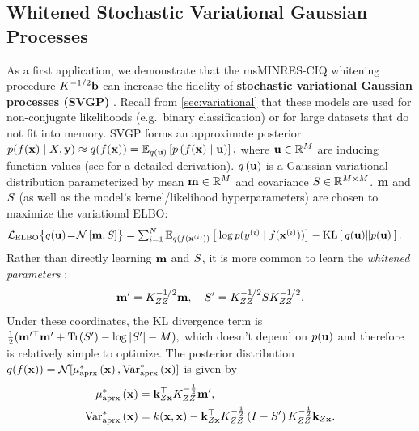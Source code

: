 \subsection{Whitened Stochastic Variational Gaussian Processes}
\label{sec:variational_results}

As a first application, we demonstrate that the msMINRES-CIQ whitening procedure $K^{-1/2} \mathbf{b}$ can increase the fidelity of {\bf stochastic variational Gaussian processes (SVGP)} \cite{hensman2013gaussian,hensman2015scalable,matthews2017scalable}.
Recall from \cref{sec:variational} that these models are used for non-conjugate likelihoods (e.g.~binary classification) or for large datasets that do not fit into memory.
SVGP forms an approximate posterior
$
  p(f(\mathbf{x}) \mid X, \mathbf{y}) \approx q(f(\mathbf{x})) = \operatorname*{\mathbb{E}}_{q(\mathbf{u})} \left[  p\left( f(\mathbf{x}) \mid \mathbf{u} \right) \right],
$
where $\mathbf{u} \in \mathbb{R}^M$ are {inducing function values} (see \citep{hensman2015scalable,matthews2017scalable} for a detailed derivation).
$q \left( \mathbf{u} \right)$ is a Gaussian variational distribution parameterized by mean $\mathbf{m} \in \mathbb{R}^M$ and covariance $S \in \mathbb{R}^{M \times M}$.
$\mathbf{m}$ and $S$ (as well as the model's kernel/likelihood hyperparameters) are chosen to maximize the variational ELBO:
%
\begin{align*}
  \loglik_\text{ELBO}\bigl\{ q(\bu) \! = \! \normaldist{\bmm}{\bS} \bigr\} &= \textstyle\sum_{i=1}^N \Evover{q(f(\bx^{(i)}))}{  \: \log p( y^{(i)} \mid f(\bx^{(i)}) ) } - \kl{ q(\bu) }{ p(\bu) }.
\end{align*}
%
Rather than directly learning $\mathbf{m}$ and $S$, it is more common to learn the \emph{whitened parameters} \cite{kuss2005assessing,matthews2017scalable}:
$$ \mathbf{m}' = K_{ZZ}^{- 1/ 2} \mathbf{m}, \quad S' = K_{ZZ}^{-1 / 2} S K_{ZZ}^{-1 / 2}. $$
Under these coordinates, the KL divergence term is
$\frac{1}{2} ( \bmm^{\prime \top} \bmm' + \tr{ \bS' } - \log \vert \bS' \vert - M ),$
%
which doesn't depend on $p(\mathbf{u})$ and therefore is relatively simple to optimize.
The posterior distribution $q(f(\bx)) = \normaldist{\ameantest{\bx}}{\avartest{\bx}}$ is given by
%
\begin{equation}
  \begin{split}
    \mu^*_\text{aprx} \left( \mathbf{x} \right) &= \mathbf{k}_{Z\mathbf{x}}^\top K_{ZZ}^{-\frac 1 2} \mathbf{m}',
    \\
    \text{Var}^*_\text{aprx} \left( \mathbf{x} \right) &= k(\mathbf{x}, \mathbf{x}) -
      \mathbf{k}_{Z\mathbf{x}}^\top K_{ZZ}^{-\frac 1 2} \left( I - S' \right) K_{ZZ}^{-\frac 1 2} \mathbf{k}_{Z\mathbf{x}}.
  \end{split}
  \label{eqn:approx_pred_dist}
\end{equation}

